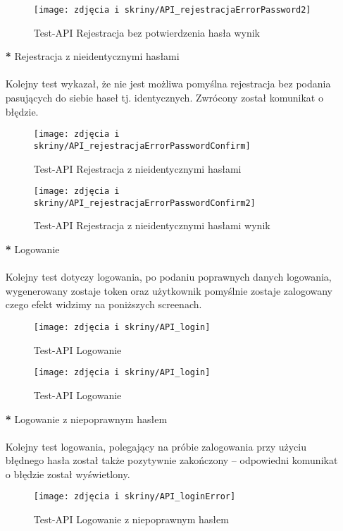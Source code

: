 \documentclass[12pt,a4paper]{article}
\begin{document}
\begin{itemize}
\begin{figure}[H]
\end{figure}
\begin{figure}[H]
\centering
\texttt{[image: zdjęcia i skriny/API\_rejestracjaErrorPassword2]}
\caption{Test-API Rejestracja bez potwierdzenia hasła wynik}
\end{figure}

\item [\textbf{*}] Rejestracja z nieidentycznymi hasłami\\
\\
Kolejny test wykazał, że nie jest możliwa pomyślna rejestracja bez podania pasujących do siebie haseł tj. identycznych. Zwrócony został komunikat o błędzie. 
\begin{figure}[H]
\centering
\texttt{[image: zdjęcia i skriny/API\_rejestracjaErrorPasswordConfirm]}
\caption{Test-API Rejestracja z nieidentycznymi hasłami}

\end{figure}
\begin{figure}[H]
\centering
\texttt{[image: zdjęcia i skriny/API\_rejestracjaErrorPasswordConfirm2]}
\caption{Test-API Rejestracja z nieidentycznymi hasłami wynik}
\end{figure}

\item [\textbf{*}] Logowanie\\
\\
Kolejny test dotyczy logowania, po podaniu poprawnych danych logowania, wygenerowany zostaje token oraz użytkownik pomyślnie zostaje zalogowany czego efekt widzimy na poniższych screenach.
\begin{figure}[H]
\centering
\texttt{[image: zdjęcia i skriny/API\_login]}
\caption{Test-API Logowanie}

\end{figure}
\begin{figure}[H]
\centering
\texttt{[image: zdjęcia i skriny/API\_login]}
\caption{Test-API Logowanie}
\end{figure}

\item [\textbf{*}] Logowanie z niepoprawnym hasłem\\
\\
Kolejny test logowania, polegający na próbie zalogowania przy użyciu błędnego hasła został także pozytywnie zakończony – odpowiedni komunikat o błędzie został wyświetlony.
\begin{figure}[H]
\centering
\texttt{[image: zdjęcia i skriny/API\_loginError]}
\caption{Test-API Logowanie z niepoprawnym hasłem}


\end{figure}
\end{itemize}
\end{document}
